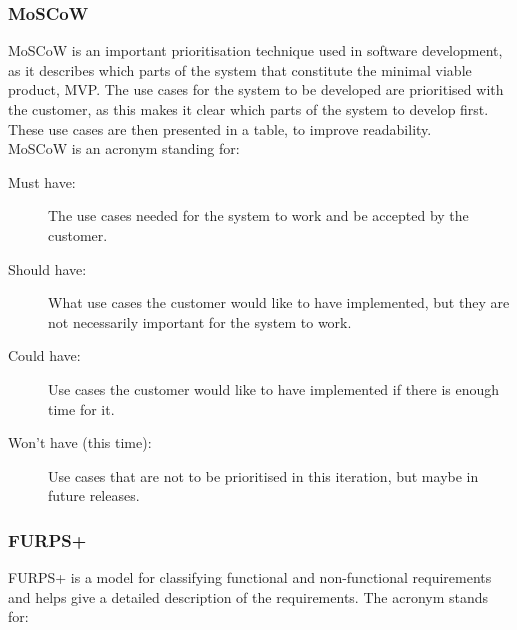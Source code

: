 \subsubsection{MoSCoW}
MoSCoW is an important prioritisation technique used in software development, as
it describes which parts of the system that constitute the minimal viable
product, MVP. The use cases for the system to be developed are prioritised with
the customer, as this makes it clear which parts of the system to develop first.
\cite{moscow} These use cases are then presented in a table, to improve
readability.\\

MoSCoW is an acronym standing for:\\

\begin{description}
    \item [Must have:] The use cases needed for the system to work and be
    accepted by the customer.

    \item [Should have:] What use cases the customer would like to have
    implemented, but they are not necessarily important for the system to work.

    \item [Could have:] Use cases the customer would like to have implemented if
    there is enough time for it.

    \item [Won't have (this time):] Use cases that are not to be prioritised in
    this iteration, but maybe in future releases.
\end{description}

\subsubsection{FURPS+}
FURPS+ is a model for classifying functional and non-functional requirements and
helps give a detailed description of the requirements. \cite{furps} The acronym
stands for: 

